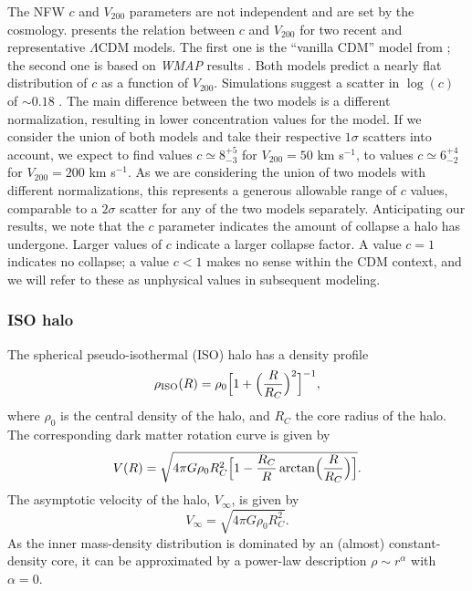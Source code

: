 \documentclass[usenatbib,usegraphicx,apjfonts,floatfix]{emulateapj}
\begin{document}
The NFW $c$ and $V_{200}$ parameters are not independent and are set
by the cosmology. \citet{stacy07} presents the relation between $c$
and $V_{200}$ for two recent and representative $\Lambda$CDM
models. The first one is the ``vanilla CDM'' model from
\citet{tegmark}; the second one is based on  \emph{WMAP}
results \citep{spergel2006}. Both models predict a nearly flat
distribution of $c$ as a function of $V_{200}$.  Simulations suggest a
scatter in $\log(c)$ of $\sim 0.18$ \citep{bullock01}. The main
difference between the two models is a different normalization,
resulting in lower concentration values for the \citet{spergel2006}
model. If we consider the union of both models and take their
respective $1\sigma$ scatters into account, we expect to find values
$c \simeq 8_{-3}^{+5}$ for $V_{200} = 50$ km s$^{-1}$, to values $c
\simeq 6_{-2}^{+4}$ for $V_{200} = 200$ km s$^{-1}$. As we are
considering the union of two models with different normalizations,
this represents a generous allowable range of $c$ values, comparable
to a $2\sigma$ scatter for any of the two models
separately. Anticipating our results, we note that the
$c$ parameter indicates the amount of collapse a halo has
undergone. Larger values of $c$ indicate a larger collapse factor.  A
value $c=1$ indicates no collapse; a value $c<1$ makes no sense within
the CDM context, and we will refer to these as unphysical values in subsequent modeling.


\subsubsection{ISO halo}

The spherical pseudo-isothermal (ISO) halo has a density profile
\begin{equation}
\rho_{\rm ISO}(R) = \rho_0 \Bigl[ 1 + \Bigl(
{{R}\over{R_C}} \Bigr)^2 \Bigr]^{-1},
\end{equation}
where $\rho_0$ is
the central density of the halo, and $R_C$ the core radius of the
halo.  The corresponding dark matter rotation curve is given by
\begin{equation} V(R) = \sqrt{ 4\pi G\rho_0 R_C^2 \Bigl[ 1 -
{{R_C}\over{R}}\arctan \Bigl( {{R}\over{R_C}} \Bigr) \Bigr] }.
\end{equation}
The asymptotic velocity of the halo, $V_{\infty}$, is given by
\begin{equation}
  V_{\infty} = \sqrt{ 4 \pi G \rho_0 R_C^2 }.
\end{equation}
As the inner mass-density distribution is dominated by an (almost) constant-density core,
it can be approximated by a power-law description $\rho \sim r^\alpha$ with $\alpha = 0$.
\end{document}
